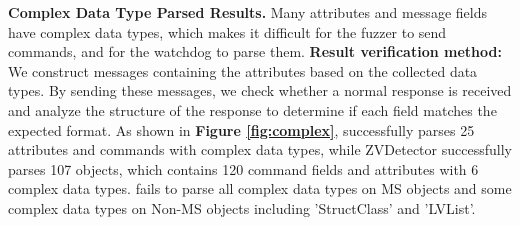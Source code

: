 \documentclass[10pt,journal,compsoc]{IEEEtran}
\begin{document}
\textbf{Complex Data Type Parsed Results.} Many attributes and message fields have complex data types, which makes it difficult for the fuzzer to send commands, and for the watchdog to parse them. \textbf{Result verification method:} We construct messages containing the attributes based on the collected data types. By sending these messages, we check whether a normal response is received and analyze the structure of the response to determine if each field matches the expected format. As shown in \textbf{Figure \ref{fig:complex}}, \textbf{{\color{Orange}{B4}}} successfully parses 25 attributes and commands with complex data types, while ZVDetector successfully parses 107 objects, which contains 120 command fields and attributes with 6 complex data types. \textbf{{\color{Orange}{B4}}} fails to parse all complex data types on MS objects and some complex data types on Non-MS objects including 'StructClass' and 'LVList'. 
\end{document}
